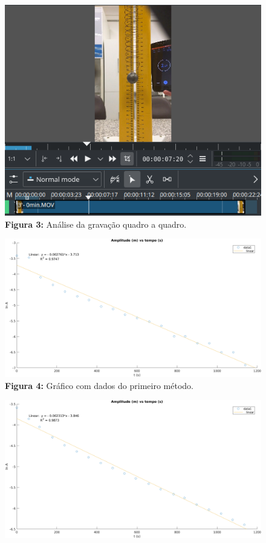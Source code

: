 \documentclass[a4paper, 12pt]{article}
\begin{document}
\begin{multicols}{2}
			\begin{figure}[H] \label{img:quadros}
				\centering
				\includegraphics[scale=0.4]{./img/quadros.png}
				\captionsetup{labelformat=empty}
				\caption{\textbf{Figura 3:} Análise da gravação quadro a quadro.}
			\end{figure}
			\begin{figure}[H] \label{img:m1}
				\centering
				\includegraphics[scale=0.3]{./img/m1.png}
				\captionsetup{labelformat=empty}
				\caption{\textbf{Figura 4:} Gráfico com dados do primeiro método.}
			\end{figure}
			\begin{figure}[H] \label{img:m2}
				\centering
				\includegraphics[scale=0.3]{./img/m2.png}

\end{figure}
\end{multicols}
\end{document}
